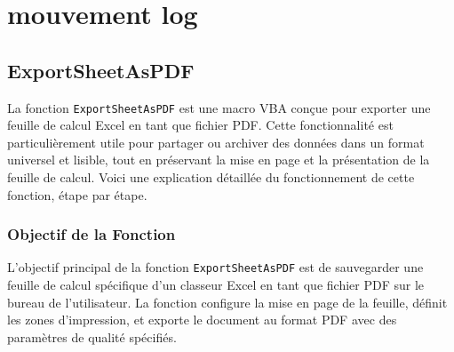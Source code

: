 \documentclass[a4paper, oneside, 12pt, final]{extreport}
\begin{document}
\section{mouvement log}
\subsection{ExportSheetAsPDF}

La fonction \texttt{ExportSheetAsPDF} est une macro VBA conçue pour exporter une feuille de calcul Excel en tant que fichier PDF. Cette fonctionnalité est particulièrement utile pour partager ou archiver des données dans un format universel et lisible, tout en préservant la mise en page et la présentation de la feuille de calcul. Voici une explication détaillée du fonctionnement de cette fonction, étape par étape.

\subsubsection{Objectif de la Fonction}

L'objectif principal de la fonction \texttt{ExportSheetAsPDF} est de sauvegarder une feuille de calcul spécifique d'un classeur Excel en tant que fichier PDF sur le bureau de l'utilisateur. La fonction configure la mise en page de la feuille, définit les zones d'impression, et exporte le document au format PDF avec des paramètres de qualité spécifiés.
\end{document}

